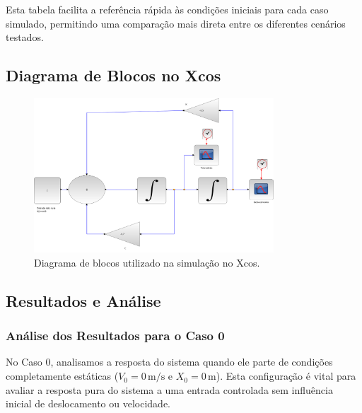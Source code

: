 Esta tabela facilita a referência rápida às condições iniciais para cada caso simulado, permitindo uma comparação mais direta entre os diferentes cenários testados.

\subsection{Diagrama de Blocos no Xcos}
\begin{figure}[H]
    \centering
    \includegraphics[width=0.8\textwidth]{final/2-atividade/assets/diagrama.png}
    \caption{Diagrama de blocos utilizado na simulação no Xcos.}
\end{figure}

\subsection{Resultados e Análise}


\subsubsection{Análise dos Resultados para o Caso 0}
No Caso 0, analisamos a resposta do sistema quando ele parte de condições completamente estáticas (\(V_0 = 0 \, \text{m/s}\) e \(X_0 = 0 \, \text{m}\)). Esta configuração é vital para avaliar a resposta pura do sistema a uma entrada controlada sem influência inicial de deslocamento ou velocidade.


